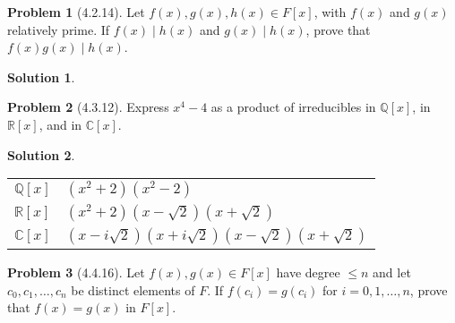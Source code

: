 \documentclass[12pt]{article}
\theoremstyle{definition}
\newtheorem*{prob}{Problem}
\newtheorem*{soln}{Solution}
\newcommand{\CC}{{\mathbb{C}}}
\newcommand{\ZZ}{{\mathbb{Z}}}
\newcommand{\RR}{{\mathbb{R}}}
\newcommand{\QQ}{{\mathbb{Q}}}
\begin{document}
\begin{prob}[4.2.14]
Let $f(x), g(x), h(x)\in F[x]$, with $f(x)$ and $g(x)$ relatively prime. 
If  $f(x) \mid h(x)$ and $g(x) \mid h(x)$, prove that $f(x)g(x) \mid h(x)$.
\end{prob}

\begin{soln}

\end{soln}


\begin{prob}[4.3.12]
Express $x^4 - 4$ as a product of irreducibles in $\QQ[x]$, in $\RR[x]$, and in $\CC[x]$.
\end{prob}

\begin{soln}
\quad

\begin{tabular}{l l}
$\QQ[x]$ & $(x^2+2)(x^2-2)$\\
$\RR[x]$ & $(x^2+2)(x-\sqrt2)(x+\sqrt2)$\\
$\CC[x]$ & $(x-i\sqrt2)(x+i\sqrt2)(x-\sqrt2)(x+\sqrt2)$\\
\end{tabular}

\end{soln}


%
%
%

%
%

\begin{prob}[4.4.16]
Let $f(x), g(x) \in F[x]$ have degree $\leq n$ and let 
$c_0, c_1, \dots, c_n$ be distinct elements of  $F$. If  $f(c_i) = g(c_i)$ for 
$i = 0, 1, \dots, n$, prove that $f(x) = g(x)$ in $F[x]$.
\end{prob}
\end{document}
